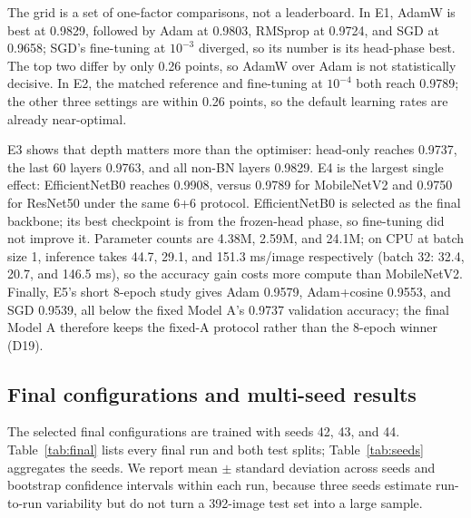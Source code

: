 \documentclass[11pt,a4paper]{article}
\begin{document}
The grid is a set of one-factor comparisons, not a leaderboard. In E1, AdamW is
best at 0.9829, followed by Adam at 0.9803, RMSprop at 0.9724, and SGD at
0.9658; SGD's fine-tuning at $10^{-3}$ diverged, so its number is its head-phase
best. The top two differ by only 0.26 points, so AdamW over Adam is not
statistically decisive. In E2, the matched reference and fine-tuning at
$10^{-4}$ both reach 0.9789; the other three settings are within 0.26 points,
so the default learning rates are already near-optimal.

E3 shows that depth matters more than the optimiser: head-only reaches 0.9737,
the last 60 layers 0.9763, and all non-BN layers 0.9829. E4 is the largest
single effect: EfficientNetB0 reaches 0.9908, versus 0.9789 for MobileNetV2 and
0.9750 for ResNet50 under the same 6+6 protocol. EfficientNetB0 is selected as
the final backbone; its best checkpoint is from the frozen-head phase, so
fine-tuning did not improve it. Parameter counts are 4.38M, 2.59M, and 24.1M;
on CPU at batch size 1, inference takes 44.7, 29.1, and 151.3 ms/image
respectively (batch 32: 32.4, 20.7, and 146.5 ms), so the accuracy gain costs
more compute than MobileNetV2. Finally, E5's short 8-epoch study gives Adam
0.9579, Adam+cosine 0.9553, and
SGD 0.9539, all below the fixed Model A's 0.9737 validation accuracy; the final
Model A therefore keeps the fixed-A protocol rather than the 8-epoch winner
(D19).

\subsection{Final configurations and multi-seed results}
The selected final configurations are trained with seeds 42, 43, and 44.
Table~\ref{tab:final} lists every final run and both test splits;
Table~\ref{tab:seeds} aggregates the seeds. We report mean $\pm$ standard
deviation across seeds and bootstrap confidence intervals within each run,
because three seeds estimate run-to-run variability but do not turn a
392-image test set into a large sample.

\begin{table}[H]\centering
\caption{Final runs (E6 seeds 42--44 plus the fixed Model A). ``Released'' is
the leaked split; ``leak-free'' is the cluster-grouped control.}
\label{tab:final}\end{table}

\begin{table}[H]\centering
\small
\caption{Final configurations aggregated over seeds 42--44 (mean $\pm$ standard
deviation).}
\label{tab:seeds}\end{table}
\end{document}
